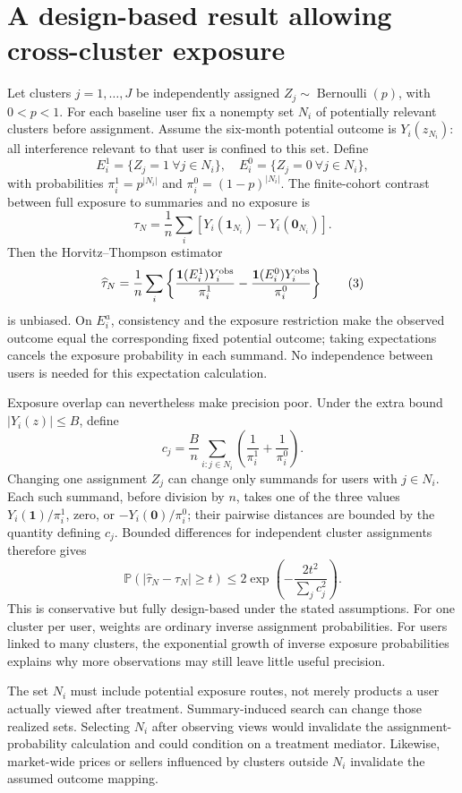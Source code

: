 \documentclass[11pt]{article}
\newcommand{\Pp}{\mathbb{P}}
\begin{document}
\section{A design-based result allowing cross-cluster exposure}
Let clusters $j=1,\ldots,J$ be independently assigned $Z_j\sim
\operatorname{Bernoulli}(p)$, with $0<p<1$. For each baseline user fix a
nonempty set $N_i$ of potentially relevant clusters before assignment.
Assume the six-month potential outcome is $Y_i(z_{N_i})$: all interference
relevant to that user is confined to this set. Define
\[
 E_i^1=\{Z_j=1\ \forall j\in N_i\},\quad
 E_i^0=\{Z_j=0\ \forall j\in N_i\},
\]
with probabilities $\pi_i^1=p^{|N_i|}$ and
$\pi_i^0=(1-p)^{|N_i|}$. The finite-cohort contrast between full exposure
to summaries and no exposure is
\[
 \tau_N=\frac1n\sum_i[Y_i(\mathbf1_{N_i})-Y_i(\mathbf0_{N_i})].
\]
Then the Horvitz--Thompson estimator
\[
 \widehat\tau_N=\frac1n\sum_i\left\{
 \frac{\mathbf1(E_i^1)Y_i^{\rm obs}}{\pi_i^1}
 -\frac{\mathbf1(E_i^0)Y_i^{\rm obs}}{\pi_i^0}\right\}       \tag{3}
\]
is unbiased. On $E_i^a$, consistency and the exposure restriction make the
observed outcome equal the corresponding fixed potential outcome;
taking expectations cancels the exposure probability in each summand.
No independence between users is needed for this expectation calculation.

Exposure overlap can nevertheless make precision poor. Under the extra
bound $|Y_i(z)|\le B$, define
\[
 c_j=\frac{B}{n}\sum_{i:j\in N_i}
       \left(\frac1{\pi_i^1}+\frac1{\pi_i^0}\right).
\]
Changing one assignment $Z_j$ can change only summands for users with
$j\in N_i$. Each such summand, before division by $n$, takes one of the
three values $Y_i(\mathbf1)/\pi_i^1$, zero, or
$-Y_i(\mathbf0)/\pi_i^0$; their pairwise distances are bounded by the
quantity defining $c_j$. Bounded differences for independent cluster
assignments therefore gives
\[
 \Pp(|\widehat\tau_N-\tau_N|\ge t)
 \le2\exp\left(-\frac{2t^2}{\sum_jc_j^2}\right).           \tag{4}
\]
This is conservative but fully design-based under the stated assumptions.
For one cluster per user, weights are ordinary inverse assignment
probabilities. For users linked to many clusters, the exponential growth
of inverse exposure probabilities explains why more observations may
still leave little useful precision.

The set $N_i$ must include potential exposure routes, not merely products
a user actually viewed after treatment. Summary-induced search can change
those realized sets. Selecting $N_i$ after observing views would invalidate
the assignment-probability calculation and could condition on a treatment
mediator. Likewise, market-wide prices or sellers influenced by clusters
outside $N_i$ invalidate the assumed outcome mapping.
\end{document}

